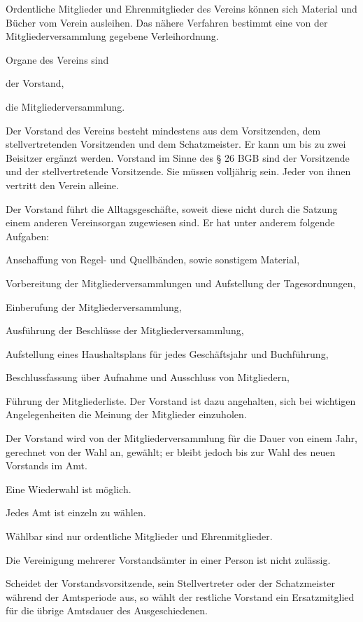 \begin{contract}
	\item Ordentliche Mitglieder und Ehrenmitglieder des Vereins können sich Material und Bücher vom Verein ausleihen. Das nähere Verfahren bestimmt eine von der Mitgliederversammlung gegebene Verleihordnung.

Organe des Vereins sind
	\begin{subpara}
	\item der Vorstand,
	\item die Mitgliederversammlung.
	\end{subpara}

	\item Der Vorstand des Vereins besteht mindestens aus dem Vorsitzenden, dem stellvertretenden Vorsitzenden und dem Schatzmeister.
	Er kann um bis zu zwei Beisitzer ergänzt werden.
	 Vorstand im Sinne des § 26 BGB sind der Vorsitzende und der stellvertretende Vorsitzende. Sie müssen volljährig sein. Jeder von ihnen vertritt den Verein alleine.

	\item Der Vorstand führt die Alltagsgeschäfte, soweit diese nicht durch die Satzung einem anderen Vereinsorgan zugewiesen sind. Er hat unter anderem folgende Aufgaben:
	\begin{subpara}
		\item Anschaffung von Regel- und Quellbänden, sowie sonstigem Material,
		\item Vorbereitung der Mitgliederversammlungen und Aufstellung der Tagesordnungen,
		\item Einberufung der Mitgliederversammlung,
		\item Ausführung der Beschlüsse der Mitgliederversammlung,
		\item Aufstellung eines Haushaltsplans für jedes Geschäftsjahr und Buchführung,
		\item Beschlussfassung über Aufnahme und Ausschluss von Mitgliedern,
		\item Führung der Mitgliederliste.
		Der Vorstand ist dazu angehalten, sich bei wichtigen Angelegenheiten die Meinung der Mitglieder einzuholen.
	\end{subpara}
	\item Der Vorstand wird von der Mitgliederversammlung für die Dauer von einem Jahr, gerechnet von der Wahl an, gewählt; er bleibt jedoch bis zur Wahl des neuen Vorstands im Amt. 
	\item Eine Wiederwahl ist möglich.
	\item Jedes Amt ist einzeln zu wählen.
	\item Wählbar sind nur ordentliche Mitglieder und Ehrenmitglieder.
	\item Die Vereinigung mehrerer Vorstandsämter in einer Person ist nicht zulässig.
	\item Scheidet der Vorstandsvorsitzende, sein Stellvertreter oder der Schatzmeister während der Amtsperiode aus, so wählt der restliche Vorstand ein Ersatzmitglied für die übrige Amtsdauer des Ausgeschiedenen.


\end{contract}

